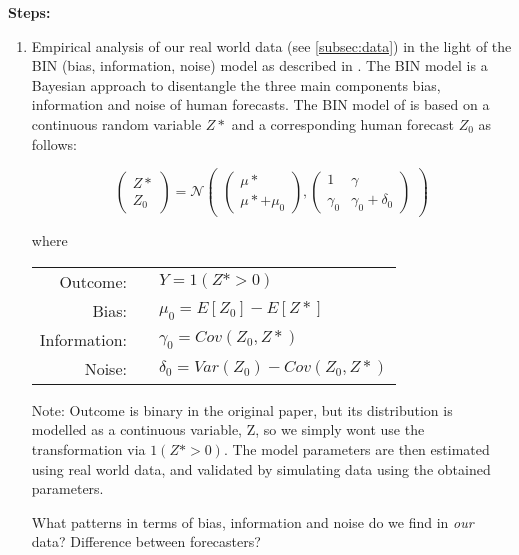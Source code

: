 \documentclass[12pt,a4paper]{article}
\begin{document}
\textbf{Steps:}    
\begin{enumerate}
	
	\item Empirical analysis of our real world data (see \ref{subsec:data}) in the light of the BIN (bias, information, noise) model as described in \cite{satopaa2021bias}. The BIN model is a Bayesian approach to disentangle the three main components bias, information and noise of human forecasts. The BIN model of \cite{satopaa2021bias} is based on a continuous random variable $Z*$ and a corresponding human forecast $Z_0$ as follows:
	
\begin{equation}
  \begin{pmatrix}
  	Z*\\Z_0
  \end{pmatrix}
  = \mathcal{N}
  \begin{pmatrix}
	\begin{pmatrix}  
	\mu*\\\mu* + \mu_0
  	\end{pmatrix},
  	\begin{pmatrix}
		1 & \gamma \\
		\gamma_0 & \gamma_0 + \delta_0
  	\end{pmatrix}
  \end{pmatrix}  
\end{equation}
	
where	
	
\begin{center}	
\begin{tabular}{r c l}
Outcome: && $ Y = 1(Z* > 0)$ \\
Bias: && $\mu_0 = E[Z_0] - E[Z*]$ \\
Information: && $\gamma_0 = Cov(Z_0, Z*)$ \\
Noise: && $\delta_0 = Var(Z_0) - Cov(Z_0, Z*)$ \\
\end{tabular}
\end{center}
	
Note: Outcome is binary in the original paper, but its distribution is modelled as a continuous variable, Z, so we simply wont use the transformation via $1(Z* > 0)$. The model parameters are then estimated using real world data, and validated by simulating data using the obtained parameters.
	
What patterns in terms of bias, information and noise do we find in \emph{our} data? Difference between forecasters? 


\end{enumerate}
\end{document}
